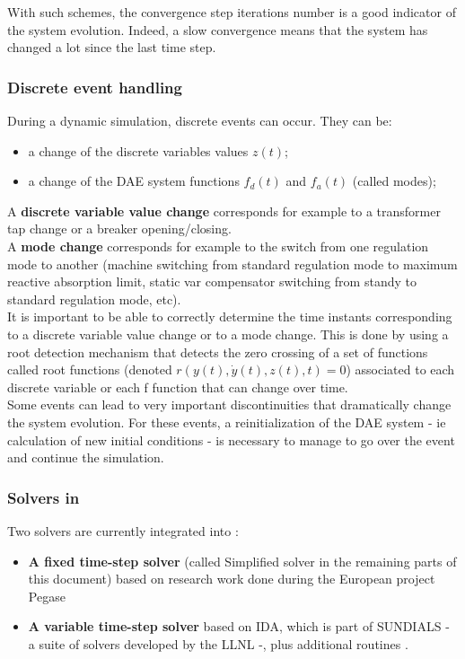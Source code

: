 \documentclass[a4paper, 12pt]{report}
\begin{document}
With such schemes, the convergence step iterations number is a good indicator of the system evolution. Indeed, a slow convergence means that the system has changed a lot since the last time step.

\subsubsection{Discrete event handling}

During a dynamic simulation, discrete events can occur. They can be:
\begin{itemize}
\item a change of the discrete variables values $z(t)$;
\item a change of the \ac{DAE} system functions $f_d(t)$ and $f_a(t)$ (called modes);
\end{itemize} 

A \textbf{discrete variable value change} corresponds for example to a transformer tap change or a breaker opening/closing. \\

A \textbf{mode change} corresponds for example to the switch from one regulation mode to another (machine switching from standard regulation mode to maximum reactive absorption limit, static var compensator switching from standy to standard regulation mode, etc). \\

It is important to be able to correctly determine the time instants corresponding to a discrete variable value change or to a mode change. This is done by using a root detection mechanism that detects the zero crossing of a set of functions called root functions (denoted $r(y(t), \dot{y}(t), z(t), t) = 0$) associated to each discrete variable or each f function that can change over time. \\

Some events can lead to very important discontinuities that dramatically change the system evolution. For these events, a reinitialization of the \ac{DAE} system - ie calculation of new initial conditions - is necessary to manage to go over the event and continue the simulation. \\

\subsubsection{Solvers in \Dynawo}

Two solvers are currently integrated into \Dynawo:
\begin{itemize}
\item \textbf{A fixed time-step solver} (called Simplified solver in the remaining parts of this document) based on research work done during the European project Pegase \cite{Pegase_Report, Pegase_Events, Pegase_IEEE_GM}
\item \textbf{A variable time-step solver} based on IDA, which is part of \ac{SUNDIALS} - a suite of solvers developed by the \ac{LLNL} -, plus additional routines \cite{hindmarsh2005sundials}.
\end{itemize} 
\end{document}
